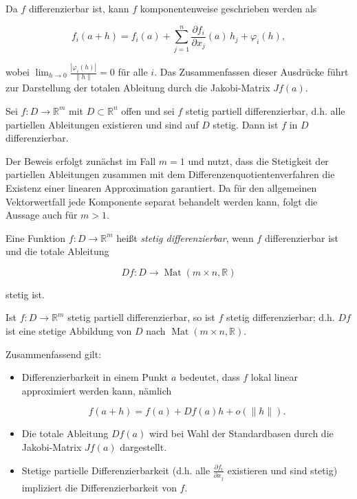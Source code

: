 \begin{beweisbox}
Da $ f $ differenzierbar ist, kann $ f $ komponentenweise geschrieben werden als


$$
f_i(a+h)= f_i(a) + \sum_{j=1}^n \frac{\partial f_i}{\partial x_j}(a)\, h_j + \varphi_i(h),
$$


wobei $ \lim_{h\to 0}\frac{|\varphi_i(h)|}{\|h\|}=0 $ für alle $ i $. Das Zusammenfassen dieser Ausdrücke führt zur Darstellung der totalen Ableitung durch die Jakobi-Matrix $ Jf(a) $.
\end{beweisbox}

\begin{satz}{}
Sei $ f: D \to \mathbb{R}^m $ mit $ D \subset \mathbb{R}^n $ offen und sei $ f $ stetig partiell differenzierbar, d.h. alle partiellen Ableitungen existieren und sind auf $ D $ stetig. Dann ist $ f $ in $ D $ differenzierbar.
\end{satz}

\begin{beweisbox}
Der Beweis erfolgt zunächst im Fall $ m=1 $ und nutzt, dass die Stetigkeit der partiellen Ableitungen zusammen mit dem Differenzenquotientenverfahren die Existenz einer linearen Approximation garantiert. Da für den allgemeinen Vektorwertfall jede Komponente separat behandelt werden kann, folgt die Aussage auch für $ m>1 $.
\end{beweisbox}

\begin{definition}{}{}
Eine Funktion $ f: D \to \mathbb{R}^m $ heißt \emph{stetig differenzierbar}, wenn $ f $ differenzierbar ist und die totale Ableitung


$$
Df: D \to \operatorname{Mat}(m\times n, \mathbb{R})
$$


stetig ist.
\end{definition}

\begin{korollar}
Ist $ f: D \to \mathbb{R}^m $ stetig partiell differenzierbar, so ist $ f $ stetig differenzierbar; d.h. $ Df $ ist eine stetige Abbildung von $ D $ nach $ \operatorname{Mat}(m\times n, \mathbb{R}) $.
\end{korollar}

\begin{bemerkungbox}
Zusammenfassend gilt:
\begin{itemize}
    \item Differenzierbarkeit in einem Punkt $ a $ bedeutet, dass $ f $ lokal linear approximiert werden kann, nämlich
    

$$
    f(a+h)= f(a) + Df(a)h + o(\|h\|).
    $$


    \item Die totale Ableitung $ Df(a) $ wird bei Wahl der Standardbasen durch die Jakobi-Matrix $ Jf(a) $ dargestellt.
    \item Stetige partielle Differenzierbarkeit (d.h. alle $ \frac{\partial f_i}{\partial x_j} $ existieren und sind stetig) impliziert die Differenzierbarkeit von $ f $.
\end{itemize}
\end{bemerkungbox}
